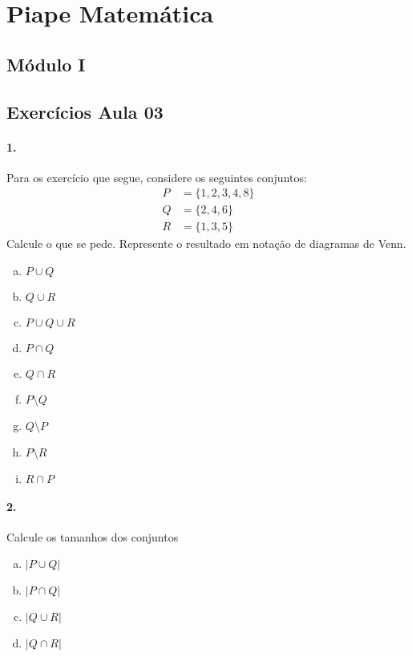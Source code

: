 \documentclass[a4paper,twocolumn,12pt]{article}
\begin{document}
 
\section*{Piape Matemática} 
 
\subsection*{Módulo I}
 
\subsection*{Exercícios Aula 03}

\paragraph{1.} Para os exercício que segue, considere os seguintes conjuntos:
\begin{align*}
P &= \{1,2,3,4,8\}\\
Q &=  \{2,4,6\}\\
R &= \{1,3,5\}
\end{align*}
Calcule o que se pede. Represente o resultado em notação de diagramas de Venn.

\medskip

\begin{minipage}[t]{0.45\columnwidth}
  \begin{enumerate}[a)]
    \item \(P\cup Q\)
    \item \(Q\cup R\)
    \item \(P\cup Q \cup R\)
    \item \(P\cap Q\)
    \item \(Q\cap R\)
  \end{enumerate}
\end{minipage}\begin{minipage}[t]{0.45\columnwidth}
  \begin{enumerate}[a)]
    \setcounter{enumi}{5}
    \item \(P\setminus Q\)
    \item \(Q\setminus P\)
    \item \(P\setminus R\)
    \item \(R\cap P\)
  \end{enumerate}
\end{minipage} 

\paragraph{2.} Calcule os tamanhos dos conjuntos
\begin{enumerate}[a)]
  \item \(|P\cup Q|\)
  \item \(|P\cap Q|\)
  \item \(|Q\cup R|\)
  \item \(|Q\cap R|\)
\end{enumerate}
\end{document}
